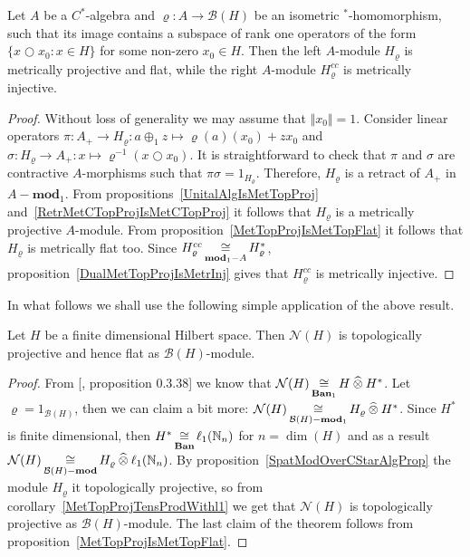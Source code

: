 \begin{proposition}\label{SpatModOverCStarAlgProp} Let $A$ be a $C^*$-algebra
and $\varrho:A\to\mathcal{B}(H)$ be an isometric ${}^*$-homomorphism, such that
its image contains a subspace of rank one operators of the 
form $ \{x\bigcirc x_0:x\in H \}$ for some non-zero $x_0\in H$. 
Then the left $A$-module $H_\varrho$ is metrically projective and flat, 
while the  right $A$-module $H_\varrho^{cc}$ is metrically injective.
\end{proposition}
\begin{proof} Without loss of generality we may assume that $\Vert x_0\Vert=1$.
Consider linear operators 
$\pi:A_+\to H_\varrho:a\oplus_1 z\mapsto \varrho(a)(x_0)+zx_0$ 
and $\sigma:H_\varrho\to A_+:x\mapsto \varrho^{-1}(x\bigcirc x_0)$. 
It is straightforward to check that $\pi$ and
$\sigma$ are contractive $A$-morphisms such that $\pi\sigma=1_{H_\varrho}$.
Therefore, $H_\varrho$ is a retract of $A_+$ in $A-\mathbf{mod}_1$. From
propositions~\ref{UnitalAlgIsMetTopProj} and~\ref{RetrMetCTopProjIsMetCTopProj} 
it follows that $H_\varrho$ is a metrically projective $A$-module. From
proposition~\ref{MetTopProjIsMetTopFlat} it follows that $H_\varrho$ is
metrically flat too. Since $H_\varrho^{cc}\mathop{\mathbin{\cong}}\limits_{\mathbf{mod}_1-A}H_\varrho^*$,
proposition~\ref{DualMetTopProjIsMetrInj} gives that $H_\varrho^{cc}$ is
metrically injective.
\end{proof}

In what follows we shall use the following simple application of the above
result.

\begin{proposition}\label{FinDimNHModTopProjFlat} Let $H$ be a finite
dimensional Hilbert space. Then $\mathcal{N}(H)$ is topologically projective and
hence flat as $\mathcal{B}(H)$-module.
\end{proposition}
\begin{proof} From [\cite{HelBanLocConvAlg}, proposition 0.3.38] we know that
$\mathcal{N}(H)\mathop{\mathbin{\cong}}\limits_{\mathbf{Ban}_1}H\mathbin{\widehat{\otimes}} H^*$. Let
$\varrho=1_{\mathcal{B}(H)}$, then we can claim a bit more:
$\mathcal{N}(H)\mathop{\mathbin{\cong}}\limits_{\mathcal{B}(H)-\mathbf{mod}_1} H_\varrho\mathbin{\widehat{\otimes}} H^*$.
Since $H^*$ is finite dimensional, then
$H^*\mathop{\mathbin{\cong}}\limits_{\mathbf{Ban}}\ell_1(\mathbb{N}_n)$ for $n=\dim(H)$ and as a result
$\mathcal{N}(H)\mathop{\mathbin{\cong}}\limits_{\mathcal{B}(H)-\mathbf{mod}}
H_\varrho\mathbin{\widehat{\otimes}}\ell_1(\mathbb{N}_n)$. By
proposition~\ref{SpatModOverCStarAlgProp} the module $H_\varrho$ it
topologically projective, so from corollary~\ref{MetTopProjTensProdWithl1} we
get that $\mathcal{N}(H)$ is topologically projective as
$\mathcal{B}(H)$-module. The last claim of the theorem follows from
proposition~\ref{MetTopProjIsMetTopFlat}.
\end{proof}

